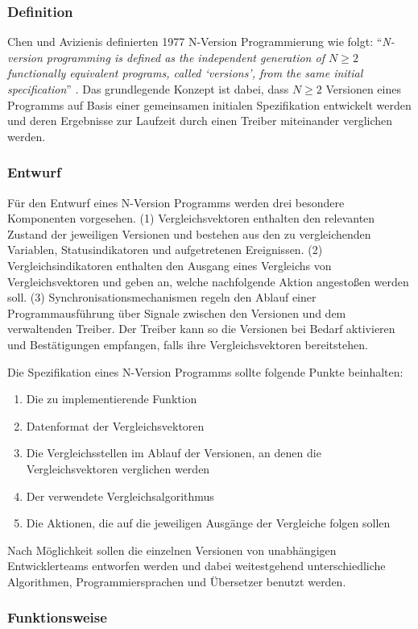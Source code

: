 \subsubsection{Definition}
Chen und Avizienis definierten 1977 N-Version Programmierung wie folgt: \enquote{\emph{N-version programming is defined as the independent generation of $ N \geq 2 $ functionally equivalent programs, called \enquote{versions}, from the same initial specification}} \cite{Chen1978}.
Das grundlegende Konzept ist dabei, dass $ N \geq 2 $ Versionen eines Programms auf Basis einer gemeinsamen initialen Spezifikation entwickelt werden und deren Ergebnisse zur Laufzeit durch einen Treiber miteinander verglichen werden.
%
%
\subsubsection{Entwurf}
Für den Entwurf eines N-Version Programms werden drei besondere Komponenten vorgesehen.
(1) Vergleichsvektoren enthalten den relevanten Zustand der jeweiligen Versionen und bestehen aus den zu vergleichenden Variablen, Statusindikatoren und aufgetretenen Ereignissen.
(2) Vergleichsindikatoren enthalten den Ausgang eines Vergleichs von Vergleichsvektoren und geben an, welche nachfolgende Aktion angestoßen werden soll. 
(3) Synchronisationsmechanismen regeln den Ablauf einer Programmausführung über Signale zwischen den Versionen und dem verwaltenden Treiber. Der Treiber kann so die Versionen bei Bedarf aktivieren und Bestätigungen empfangen, falls ihre Vergleichsvektoren bereitstehen.

Die Spezifikation eines N-Version Programms sollte folgende Punkte beinhalten:
\begin{enumerate}
	\item Die zu implementierende Funktion
	\item Datenformat der Vergleichsvektoren
	\item Die Vergleichsstellen im Ablauf der Versionen, an denen die Vergleichsvektoren verglichen werden
	\item Der verwendete Vergleichsalgorithmus
	\item Die Aktionen, die auf die jeweiligen Ausgänge der Vergleiche folgen sollen
\end{enumerate}
%
Nach Möglichkeit sollen die einzelnen Versionen von unabhängigen Entwicklerteams entworfen werden und dabei weitestgehend unterschiedliche Algorithmen, Programmiersprachen und Übersetzer benutzt werden.


\subsubsection{Funktionsweise}

